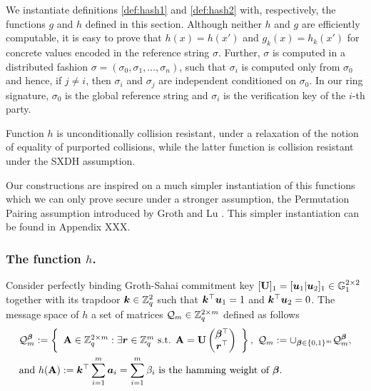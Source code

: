 
We instantiate definitions \ref{def:hash1} and \ref{def:hash2}  with, respectively, the functions $g$ and $h$ defined in this section. Although neither $h$ and $g$ are efficiently computable, it is easy to prove that $h(x)=h(x')$ and $g_k(x)=h_k(x')$ for concrete values encoded in the reference string $\sigma$. Further, $\sigma$ is computed in a distributed fashion $\sigma = (\sigma_0,\sigma_1,\ldots,\sigma_n)$, such that $\sigma_i$ is computed only from $\sigma_0$ and hence, if $j\neq i$, then $\sigma_i$ and $\sigma_j$ are independent conditioned on $\sigma_0$. In our ring signature, $\sigma_0$ is the global reference string and $\sigma_i$ is the verification key of the $i$-th party.
   
Function $h$ is unconditionally collision resistant, under a relaxation of the notion of equality of purported collisions, while the latter function is collision resistant under the SXDH assumption.


Our constructions are inspired on a much simpler instantiation of this functions which we can only prove secure under a stronger assumption, the Permutation Pairing assumption introduced by Groth and Lu \cite{AC:GroLu07}. This simpler instantiation can be found in Appendix XXX. 

\subsubsection{The function $h$.} Consider perfectly binding Groth-Sahai commitment key $[\mathbf{{U}}]_1 = [{\boldsymbol{u}}_1|{\boldsymbol{u}}_2]_1\in\mathbb{G}_1^{2\times 2}$ together with its trapdoor ${\boldsymbol{k}}\in\mathbb{Z}_q^2$ such that ${\boldsymbol{k}}^\top{\boldsymbol{u}}_1 = 1$ and ${\boldsymbol{k}}^\top{\boldsymbol{u}}_2 = 0$. The message space of $h$ a set of matrices $\mathcal{Q}_m\in\mathbb{Z}_q^{2\times m}$ defined as follows
\begin{align*}
&\mathcal{Q}_m^{\boldsymbol{\beta}} := \left\{
\begin{array}{c}
\mathbf{{A}} \in \mathbb{Z}_q^{2\times m}:
\exists {\boldsymbol{r}}\in\mathbb{Z}_q^m\text{ s.t. }
{\mathbf{{A}} = \mathbf{{U}}\left(\begin{matrix}{\boldsymbol{\beta}}^\top\\{\boldsymbol{r}}^\top\end{matrix}\right)
}
\end{array}\right\},
\ \mathcal{Q}_m := \cup_{{\boldsymbol{\beta}}\in\{0,1\}^m} \mathcal{Q}_m^{\boldsymbol{\beta}},\\
&\text{and } h(\mathbf{{A}}):= {\boldsymbol{k}}^\top\sum_{i=1}^m{\boldsymbol{a}}_i = \sum_{i=1}^m \beta_i \text{ is the hamming weight of }{\boldsymbol{\beta}}.
\end{align*}

